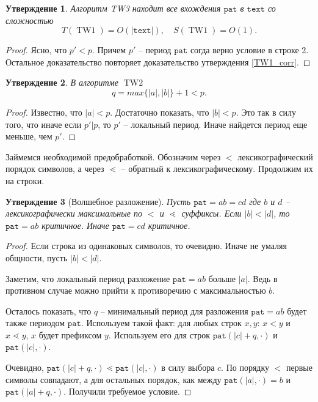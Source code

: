 \documentclass[10pt]{book}
\theoremstyle{plain}
\newtheorem{stm}{Утверждение}[section]
\newcommand{\textm}{\texttt{text}}
\newcommand{\patm}{\texttt{pat}}
\newcommand{\algm}[1]{\operatorname{#1}}
\begin{document}
\begin{stm}
  Алгоритм TW3 находит все вхождения $\patm$ в $\textm$ со сложностью
  $$T(\algm{TW1}) = O(|\textm|), \quad S(\algm{TW1}) = O(1).$$
\end{stm}
\begin{proof}
  Ясно, что $p' < p$. Причем $p'$ -- период $\patm$ согда верно условие 
  в строке 2. Остальное доказательство повторяет доказательство утверждения
  \ref{TW1_corr}.
\end{proof}

\begin{stm}
  В алгоритме $\algm{TW2}$ $$q = max \{|a|, |b|\} + 1 < p.$$
\end{stm}
\begin{proof}
  Известно, что $|a| < p$. Достаточно показать, что $|b| < p$. Это так в силу
  того, что иначе если $p' | p$, то $p'$ -- локальный период. Иначе найдется
  период еще меньше, чем $p'$.
\end{proof}

Займемся необходимой предобработкой. Обозначим через $<$ лексикографический
порядок символов, а через $\lessdot$ -- обратный к лексикографическому.
Продолжим их на строки.

\begin{stm}[Волшебное разложение]
  Пусть $\patm = ab = cd$ где $b$ и $d$ -- лексикографически максимальные по
  $<$ и $\lessdot$ суффиксы. Если $|b| < |d|$, то $\patm = ab$ критичное.
  Иначе $\patm = cd$ критичное.
\end{stm}
\begin{proof}
  Если строка из одинаковых символов, то очевидно. Иначе не умаляя общности,
  пусть $|b| < |d|$.
  
  Заметим, что локальный период разложение $\patm = ab$ больше $|a|$. Ведь
  в противном случае можно прийти к противоречию с максимальностью $b$.

  Осталось показать, что $q$ -- минимальный период для разложения $\patm = ab$
  будет также периодом $\patm$. Используем такой факт: для любых строк $x, y$:
  $x < y$ и $x \lessdot y$, $x$ будет префиксом $y$. Используем его для строк
  $\patm(|c|+q,\cdot)$ и $\patm(|c|,\cdot)$.

  Очевидно, $\patm(|c|+q,\cdot) \lessdot \patm(|c|,\cdot)$ в силу выбора
  $c$. По порядку $<$ первые символы совпадают, а для остальных порядок, как
  между $\patm(|a|, \cdot) = b$ и $\patm(|a| + q, \cdot)$. Получили
  требуемое условие.
\end{proof}
\end{document}
